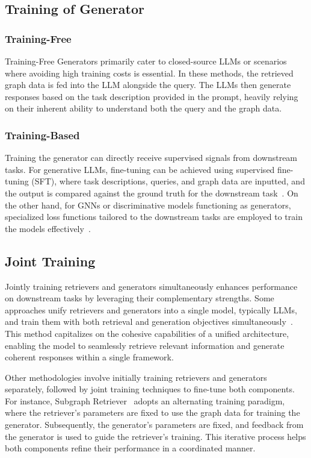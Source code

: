 \documentclass[acmsmall]{acmart}
\begin{document}
\subsection{Training of Generator}
\subsubsection{Training-Free}
Training-Free Generators primarily cater to closed-source LLMs or scenarios where avoiding high training costs is essential. In these methods, the retrieved graph data is fed into the LLM alongside the query. The LLMs then generate responses based on the task description provided in the prompt, heavily relying on their inherent ability to understand both the query and the graph data.

\subsubsection{Training-Based}
Training the generator can directly receive supervised signals from downstream tasks. For generative LLMs, fine-tuning can be achieved using supervised fine-tuning (SFT), where task descriptions, queries, and graph data are inputted, and the output is compared against the ground truth for the downstream task~\cite{ref:rog,ref:g-retriever,ref:grag}. On the other hand, for GNNs or discriminative models functioning as generators, specialized loss functions tailored to the downstream tasks are employed to train the models effectively~\cite{ref:grapeqa,ref:qa-gnn,ref:noname2,ref:safe,ref:greaselm}.

\subsection{Joint Training}
Jointly training retrievers and generators simultaneously enhances performance on downstream tasks by leveraging their complementary strengths. Some approaches unify retrievers and generators into a single model, typically LLMs, and train them with both retrieval and generation objectives simultaneously~\cite{ref:rog}. This method capitalizes on the cohesive capabilities of a unified architecture, enabling the model to seamlessly retrieve relevant information and generate coherent responses within a single framework. 

Other methodologies involve initially training retrievers and generators separately, followed by joint training techniques to fine-tune both components. For instance, Subgraph Retriever~\cite{ref:sr} adopts an alternating training paradigm, where the retriever's parameters are fixed to use the graph data for training the generator. Subsequently, the generator's parameters are fixed, and feedback from the generator is used to guide the retriever's training. This iterative process helps both components refine their performance in a coordinated manner.
\end{document}
